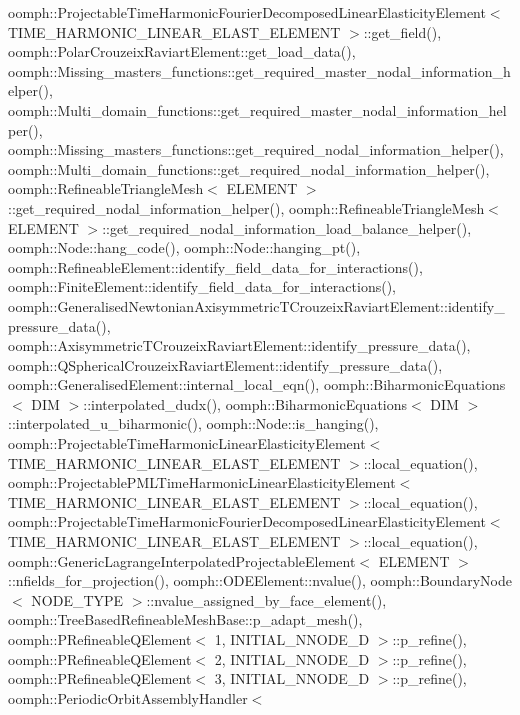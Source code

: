 oomph\+::\+Projectable\+Time\+Harmonic\+Fourier\+Decomposed\+Linear\+Elasticity\+Element$<$ T\+I\+M\+E\+\_\+\+H\+A\+R\+M\+O\+N\+I\+C\+\_\+\+L\+I\+N\+E\+A\+R\+\_\+\+E\+L\+A\+S\+T\+\_\+\+E\+L\+E\+M\+E\+N\+T $>$\+::get\+\_\+field(), oomph\+::\+Polar\+Crouzeix\+Raviart\+Element\+::get\+\_\+load\+\_\+data(), oomph\+::\+Missing\+\_\+masters\+\_\+functions\+::get\+\_\+required\+\_\+master\+\_\+nodal\+\_\+information\+\_\+helper(), oomph\+::\+Multi\+\_\+domain\+\_\+functions\+::get\+\_\+required\+\_\+master\+\_\+nodal\+\_\+information\+\_\+helper(), oomph\+::\+Missing\+\_\+masters\+\_\+functions\+::get\+\_\+required\+\_\+nodal\+\_\+information\+\_\+helper(), oomph\+::\+Multi\+\_\+domain\+\_\+functions\+::get\+\_\+required\+\_\+nodal\+\_\+information\+\_\+helper(), oomph\+::\+Refineable\+Triangle\+Mesh$<$ E\+L\+E\+M\+E\+N\+T $>$\+::get\+\_\+required\+\_\+nodal\+\_\+information\+\_\+helper(), oomph\+::\+Refineable\+Triangle\+Mesh$<$ E\+L\+E\+M\+E\+N\+T $>$\+::get\+\_\+required\+\_\+nodal\+\_\+information\+\_\+load\+\_\+balance\+\_\+helper(), oomph\+::\+Node\+::hang\+\_\+code(), oomph\+::\+Node\+::hanging\+\_\+pt(), oomph\+::\+Refineable\+Element\+::identify\+\_\+field\+\_\+data\+\_\+for\+\_\+interactions(), oomph\+::\+Finite\+Element\+::identify\+\_\+field\+\_\+data\+\_\+for\+\_\+interactions(), oomph\+::\+Generalised\+Newtonian\+Axisymmetric\+T\+Crouzeix\+Raviart\+Element\+::identify\+\_\+pressure\+\_\+data(), oomph\+::\+Axisymmetric\+T\+Crouzeix\+Raviart\+Element\+::identify\+\_\+pressure\+\_\+data(), oomph\+::\+Q\+Spherical\+Crouzeix\+Raviart\+Element\+::identify\+\_\+pressure\+\_\+data(), oomph\+::\+Generalised\+Element\+::internal\+\_\+local\+\_\+eqn(), oomph\+::\+Biharmonic\+Equations$<$ D\+I\+M $>$\+::interpolated\+\_\+dudx(), oomph\+::\+Biharmonic\+Equations$<$ D\+I\+M $>$\+::interpolated\+\_\+u\+\_\+biharmonic(), oomph\+::\+Node\+::is\+\_\+hanging(), oomph\+::\+Projectable\+Time\+Harmonic\+Linear\+Elasticity\+Element$<$ T\+I\+M\+E\+\_\+\+H\+A\+R\+M\+O\+N\+I\+C\+\_\+\+L\+I\+N\+E\+A\+R\+\_\+\+E\+L\+A\+S\+T\+\_\+\+E\+L\+E\+M\+E\+N\+T $>$\+::local\+\_\+equation(), oomph\+::\+Projectable\+P\+M\+L\+Time\+Harmonic\+Linear\+Elasticity\+Element$<$ T\+I\+M\+E\+\_\+\+H\+A\+R\+M\+O\+N\+I\+C\+\_\+\+L\+I\+N\+E\+A\+R\+\_\+\+E\+L\+A\+S\+T\+\_\+\+E\+L\+E\+M\+E\+N\+T $>$\+::local\+\_\+equation(), oomph\+::\+Projectable\+Time\+Harmonic\+Fourier\+Decomposed\+Linear\+Elasticity\+Element$<$ T\+I\+M\+E\+\_\+\+H\+A\+R\+M\+O\+N\+I\+C\+\_\+\+L\+I\+N\+E\+A\+R\+\_\+\+E\+L\+A\+S\+T\+\_\+\+E\+L\+E\+M\+E\+N\+T $>$\+::local\+\_\+equation(), oomph\+::\+Generic\+Lagrange\+Interpolated\+Projectable\+Element$<$ E\+L\+E\+M\+E\+N\+T $>$\+::nfields\+\_\+for\+\_\+projection(), oomph\+::\+O\+D\+E\+Element\+::nvalue(), oomph\+::\+Boundary\+Node$<$ N\+O\+D\+E\+\_\+\+T\+Y\+P\+E $>$\+::nvalue\+\_\+assigned\+\_\+by\+\_\+face\+\_\+element(), oomph\+::\+Tree\+Based\+Refineable\+Mesh\+Base\+::p\+\_\+adapt\+\_\+mesh(), oomph\+::\+P\+Refineable\+Q\+Element$<$ 1, I\+N\+I\+T\+I\+A\+L\+\_\+\+N\+N\+O\+D\+E\+\_\+D $>$\+::p\+\_\+refine(), oomph\+::\+P\+Refineable\+Q\+Element$<$ 2, I\+N\+I\+T\+I\+A\+L\+\_\+\+N\+N\+O\+D\+E\+\_\+D $>$\+::p\+\_\+refine(), oomph\+::\+P\+Refineable\+Q\+Element$<$ 3, I\+N\+I\+T\+I\+A\+L\+\_\+\+N\+N\+O\+D\+E\+\_\+D $>$\+::p\+\_\+refine(), oomph\+::\+Periodic\+Orbit\+Assembly\+Handler$<$ 